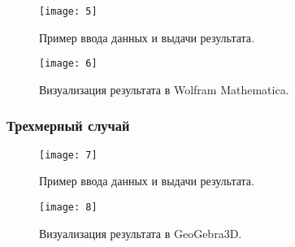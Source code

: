 \begin{figure}[h]
	{ \noindent \centering
	\texttt{[image: 5]}
	\caption{Пример ввода данных и выдачи результата.}
	}
\end{figure}

\begin{figure}[h]
	{ \noindent \centering
	\texttt{[image: 6]}
	\caption{Визуализация результата в Wolfram Mathematica.}
	}
\end{figure}

\newpage
\subsubsection{Трехмерный случай}\label{line:application:3dim}

\begin{figure}[h]
	{ \noindent \centering
	\texttt{[image: 7]}
	\caption{Пример ввода данных и выдачи результата.}
	}
\end{figure}

\begin{figure}[h]
	{ \noindent \centering
	\texttt{[image: 8]}
	\caption{Визуализация результата в GeoGebra3D.}
	}
\end{figure}